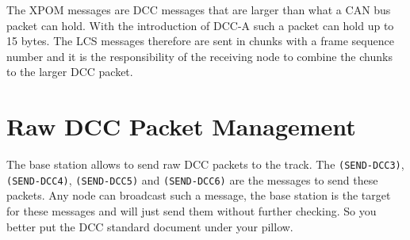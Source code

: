 \begin{table}[ht!]
    \centering 
    \caption{RailCom DCC Packet management}
\end{table}

The XPOM messages are DCC messages that are larger than what a CAN bus packet can hold. With the introduction of DCC-A such a packet can hold up to 15 bytes. The LCS messages therefore are sent in chunks with a frame sequence number and it is the responsibility of the receiving node to combine the chunks to the larger DCC packet.

\section{Raw DCC Packet Management}

The base station allows to send raw DCC packets to the track. The \texttt{(SEND-DCC3)}, \texttt{(SEND-DCC4)}, \texttt{(SEND-DCC5)} and \texttt{(SEND-DCC6)} are the messages to send these packets. Any node can broadcast such a message, the base station is the target for these messages and will just send them without further checking. So you better put the DCC standard document under your pillow.

